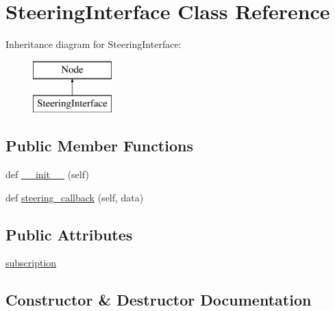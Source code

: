 \hypertarget{classtoxic__hardware_1_1servo__interface_1_1SteeringInterface}{}\section{Steering\+Interface Class Reference}
\label{classtoxic__hardware_1_1servo__interface_1_1SteeringInterface}
Inheritance diagram for Steering\+Interface\+:\begin{figure}[H]
\begin{center}
\leavevmode
\includegraphics[height=2.000000cm]{dc/d0c/classtoxic__hardware_1_1servo__interface_1_1SteeringInterface}
\end{center}
\end{figure}
\subsection*{Public Member Functions}
\begin{DoxyCompactItemize}
\item 
def \mbox{\hyperlink{classtoxic__hardware_1_1servo__interface_1_1SteeringInterface_ae64f0875afe3067b97ba370b354b9213}{\+\_\+\+\_\+init\+\_\+\+\_\+}} (self)
\item 
def \mbox{\hyperlink{classtoxic__hardware_1_1servo__interface_1_1SteeringInterface_a0762a6459eadaed0c4fad1263e369dbd}{steering\+\_\+callback}} (self, data)
\end{DoxyCompactItemize}
\subsection*{Public Attributes}
\begin{DoxyCompactItemize}
\item 
\mbox{\hyperlink{classtoxic__hardware_1_1servo__interface_1_1SteeringInterface_a4b0698733c4dfaffe8e2b4cd952b6f82}{subscription}}
\end{DoxyCompactItemize}


\subsection{Constructor \& Destructor Documentation}
\mbox{\label{classtoxic__hardware_1_1servo__interface_1_1SteeringInterface_ae64f0875afe3067b97ba370b354b9213}} 
